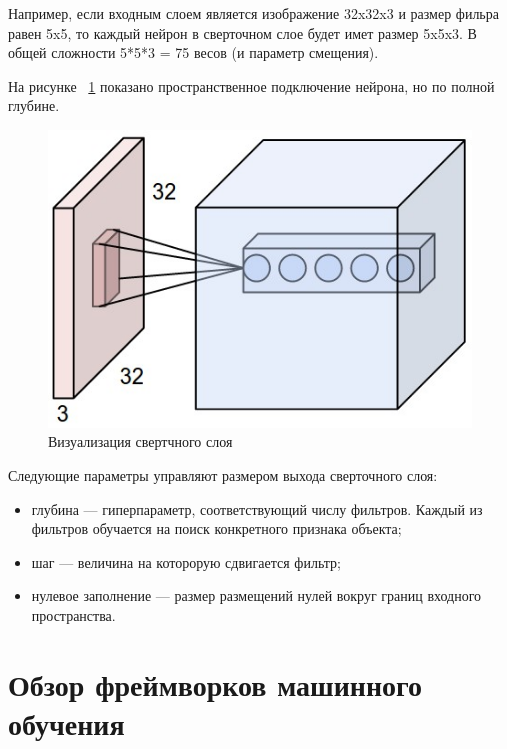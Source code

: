 \documentclass[a4paper,english,russian]{G2-105}
\begin{document}
\par Например, если входным слоем является изображение 32x32x3 и размер фильра равен 5x5, то каждый нейрон в сверточном слое будет имет размер 5x5x3. В общей сложности 5*5*3 = 75 весов (и параметр смещения). 
\par На рисунке ~\ref{depthcol} показано пространственное подключение нейрона, но по полной глубине. 
\begin{figure}
\begin{center}
    \includegraphics[width=0.5\linewidth]{depthcol.png}
    \caption{Визуализация свертчного слоя}
	\label{depthcol}
\end{center}
\end{figure}
\par Следующие параметры управляют размером выхода сверточного слоя:
\begin{itemize}
\item глубина --- гиперпараметр, соответствующий числу фильтров. Каждый из фильтров обучается на поиск конкретного признака объекта;
\item шаг --- величина на которорую сдвигается фильтр;
\item нулевое заполнение --- размер размещений нулей вокруг границ входного пространства.
\end{itemize}
\ttl


\section{Обзор фреймворков машинного обучения} \ttl \ttl
\end{document}

